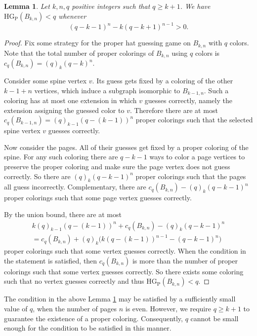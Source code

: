 \documentclass[a4paper,11pt]{amsproc}
\theoremstyle{plain}
\newtheorem{Lemma} [Theorem] {Lemma}
\theoremstyle{definition}
\newcommand{\HGP}{\mathrm{HG_{P}}}
\begin{document}
\begin{Lemma}\label{Lem:BookGraphCondition}
    Let $k,n,q$ positive integers such that $q \geq k+1$. We have $\HGP(B_{k,n}) < q$ whenever
    \begin{equation*}
        (q-k-1)^n - k(q-k+1)^{n-1} > 0.
    \end{equation*}
\end{Lemma}
\begin{proof}
    Fix some strategy for the proper hat guessing game on $B_{k,n}$ with $q$ colors. Note that the total number of proper colorings of $B_{k,n}$ using $q$ colors is $c_q(B_{k,n}) = (q)_k(q-k)^n$.

    Consider some spine vertex $v$. 
    Its guess gets fixed by a coloring of the other $k-1+n$ vertices, which induce a subgraph isomorphic to $B_{k-1,n}$. 
    Such a coloring has at most one extension in which $v$ guesses correctly, namely the extension assigning the guessed color to $v$. 
    Therefore there are at most $c_q(B_{k-1,n}) = (q)_{k-1}(q-(k-1))^n$ proper colorings such that the selected spine vertex $v$ guesses correctly.

    Now consider the pages. All of their guesses get fixed by a proper coloring of the spine. For any such coloring there are $q-k-1$ ways to color a page vertices to preserve the proper coloring and make sure the page vertex does not guess correctly. So there are $(q)_k(q-k-1)^n$ proper colorings such that the pages all guess incorrectly. Complementary, there are $c_q(B_{k,n}) - (q)_k(q-k-1)^n$ proper colorings such that some page vertex guesses correctly.

    By the union bound, there are at most 
    \begin{align*}
        k(q)_{k-1}(q-(k-1))^n + c_q(B_{k,n}) - (q)_k(q-k-1)^n \\
        = c_q(B_{k,n}) + (q)_k\big(k(q-(k-1))^{n-1} - (q-k-1)^n\big)
    \end{align*}
    proper colorings such that some vertex guesses correctly. When the condition in the statement is satisfied, then $c_q(B_{k,n})$ is more than the number of proper colorings such that some vertex guesses correctly. So there exists some coloring such that no vertex guesses correctly and thus $\HGP(B_{k,n}) < q$.
\end{proof}

The condition in the above Lemma \ref{Lem:BookGraphCondition} may be satisfied by a sufficiently small value of $q$, when the number of pages $n$ is even. However, we require $q \geq k+1$ to guarantee the existence of a proper coloring. Consequently, $q$ cannot be small enough for the condition to be satisfied in this manner.
\end{document}
